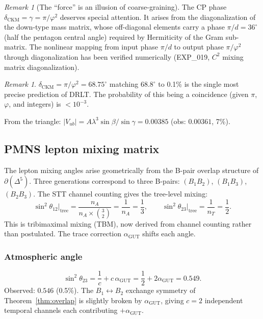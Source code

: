 \documentclass[12pt]{article}
\theoremstyle{remark}
\newtheorem{remark}[theorem]{Remark}
\theoremstyle{definition}
\newcommand{\agut}{\alpha_{\mathrm{GUT}}}
\begin{document}
\begin{remark}[The ``force'' is an illusion of coarse-graining]
The CP phase $\delta_\text{CKM} = \gamma = \pi/\varphi^2$ deserves special attention. It arises from the diagonalization of the down-type mass matrix, whose off-diagonal elements carry a phase $\pi/d = 36^\circ$ (half the pentagon central angle) required by Hermiticity of the Gram sub-matrix. The nonlinear mapping from input phase $\pi/d$ to output phase $\pi/\varphi^2$ through diagonalization has been verified numerically (EXP\_019, $C^2$ mixing matrix diagonalization).

\begin{remark}
$\delta_\text{CKM} = \pi/\varphi^2 = 68.75^\circ$ matching $68.8^\circ$ to 0.1\% is the single most precise prediction of DRLT. The probability of this being a coincidence (given $\pi$, $\varphi$, and integers) is $< 10^{-3}$.
\end{remark}

From the triangle: $|V_{ub}| = A\lambda^3\sin\beta/\sin\gamma = 0.00385$ (obs: $0.00361$, 7\%).

\subsection{PMNS lepton mixing matrix}

The lepton mixing angles arise geometrically from the B-pair overlap structure of $\partial(\Delta^5)$.  Three generations correspond to three B-pairs: $(B_1 B_2)$, $(B_1 B_3)$, $(B_2 B_3)$.  The STT channel counting gives the tree-level mixing:
\begin{equation}
\sin^2\theta_{12}\big|_\text{tree} = \frac{n_A}{n_A \times \binom{3}{2}} = \frac{1}{n_A} = \frac{1}{3}, \qquad
\sin^2\theta_{23}\big|_\text{tree} = \frac{1}{n_T} = \frac{1}{2}.
\end{equation}
This is tribimaximal mixing (TBM), now derived from channel counting rather than postulated.  The trace correction $\agut$ shifts each angle.

\subsubsection{Atmospheric angle}
\begin{equation}
\sin^2\theta_{23} = \frac{1}{c} + c\,\agut = \frac{1}{2} + 2\agut = 0.549.
\end{equation}
Observed: $0.546$ (0.5\%). The $B_1 \leftrightarrow B_2$ exchange symmetry of Theorem~\ref{thm:overlap} is slightly broken by $\agut$, giving $c = 2$ independent temporal channels each contributing $+\agut$.


\end{remark}
\end{document}

